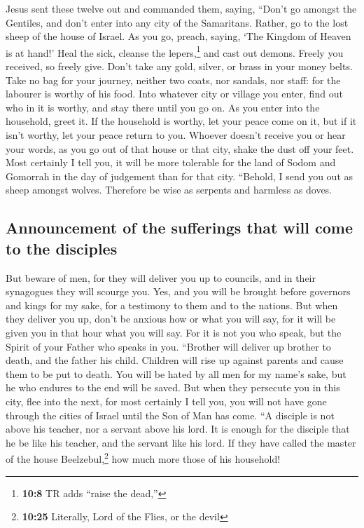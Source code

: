  Jesus sent these twelve out and commanded them, saying,
``Don't go amongst the Gentiles, and don't enter into any city of the
Samaritans.  Rather, go to the lost sheep of the house of
Israel.  As you go, preach, saying, `The Kingdom of Heaven
is at hand!'  Heal the sick, cleanse the
lepers,\footnote{\textbf{10:8} TR adds ``raise the dead,''} and cast out
demons. Freely you received, so freely give.  Don't take
any gold, silver, or brass in your money belts.  Take no
bag for your journey, neither two coats, nor sandals, nor staff: for the
labourer is worthy of his food.  Into whatever city or
village you enter, find out who in it is worthy, and stay there until
you go on.  As you enter into the household, greet it.
 If the household is worthy, let your peace come on it,
but if it isn't worthy, let your peace return to you. 
Whoever doesn't receive you or hear your words, as you go out of that
house or that city, shake the dust off your feet.  Most
certainly I tell you, it will be more tolerable for the land of Sodom
and Gomorrah in the day of judgement than for that city. 
``Behold, I send you out as sheep amongst wolves. Therefore be wise as
serpents and harmless as doves.

\hypertarget{announcement-of-the-sufferings-that-will-come-to-the-disciples}{%
\subsection{Announcement of the sufferings that will come to the
disciples}\label{announcement-of-the-sufferings-that-will-come-to-the-disciples}}

 But beware of men, for they will deliver you up to
councils, and in their synagogues they will scourge you. 
Yes, and you will be brought before governors and kings for my sake, for
a testimony to them and to the nations.  But when they
deliver you up, don't be anxious how or what you will say, for it will
be given you in that hour what you will say.  For it is
not you who speak, but the Spirit of your Father who speaks in you.
 ``Brother will deliver up brother to death, and the
father his child. Children will rise up against parents and cause them
to be put to death.  You will be hated by all men for my
name's sake, but he who endures to the end will be saved.
 But when they persecute you in this city, flee into the
next, for most certainly I tell you, you will not have gone through the
cities of Israel until the Son of Man has come.  ``A
disciple is not above his teacher, nor a servant above his lord.
 It is enough for the disciple that he be like his
teacher, and the servant like his lord. If they have called the master
of the house Beelzebul,\footnote{\textbf{10:25} Literally, Lord of the
  Flies, or the devil} how much more those of his household!

